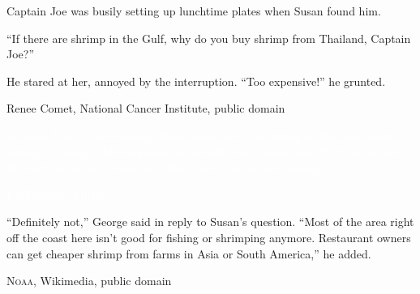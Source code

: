 \documentclass[t]{beamer}
\begin{document}
%
{
\begin{frame}[t]

	\vspace*{2\baselineskip}
	
	\hangpara \parbox{54mm}{%
		\raggedright Captain Joe was busily setting up lunchtime plates when Susan found him. 

“If there are shrimp in the Gulf, why do you buy shrimp from Thailand, Captain Joe?” \vspace*{\baselineskip}

He stared at her, annoyed by the interruption. “Too expensive!” he grunted. 
}

\vfilll

\hfill \tiny Renee Comet, National Cancer Institute, public domain
\end{frame}
}
%
{
\begin{frame}[t]

	\vspace*{5\baselineskip}
	
	\hspace*{65mm}\parbox{53mm}{%
		\raggedright \textcolor{white}{At Aunt Janet’s that evening, Susan found her aunt sitting on the front porch talking to George. After introducing herself, Susan asked him, “Is Captain Joe’s the only restaurant around here that doesn’t serve local shrimp?”}
}

\vfilll

\hfill \tiny \textcolor{white}{Ed Yourdon, Flickr, }
\end{frame}
}
%
{
\begin{frame}[t]

	\vspace*{4\baselineskip}
	
	\hspace*{65mm}\parbox{53mm}{%
		\raggedright “Definitely not,” George said in reply to Susan’s question. 
		“Most of the area right off the coast here isn’t good for fishing or shrimping 
		anymore. Restaurant owners can get cheaper shrimp from farms in Asia 
		or South America,” he added.}

\vfilll

\tiny \textsc{Noaa}, Wikimedia, public domain
\end{frame}
}
%
\end{document}
